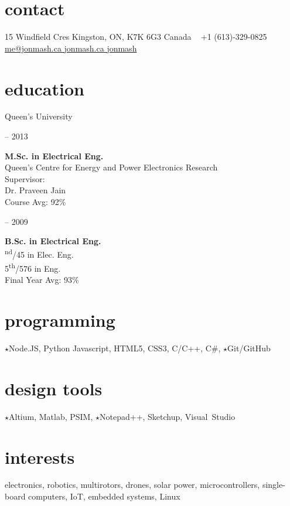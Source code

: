 
\begin{aside}
%
\section{contact}
15 Windfield Cres
Kingston, ON, K7K 6G3
Canada
~
+1 (613)-329-0825
~
\href{mailto:me@jonmash.ca}{me@jonmash.ca \faEnvelope}
\href{http://www.jonmash.ca}{jonmash.ca \faLink}
\href{https://github.com/jonmash}{jonmash \faGithub}
%
\section{education}
\restorecr
{\headingfont Queen's University}
\begin{center}
{ -- 2013} \\
\end{center}
\textbf{M.Sc. {\normalfont in Electrical Eng.}}\\
{\bodyfontit Queen’s Centre for Energy and Power Electronics Research}\\
Supervisor:\\ Dr. Praveen Jain\\
Course Avg: 92\%\\
\vspace{0.3cm}
\begin{center}
{ -- 2009} \\
\end{center}
\textbf{B.Sc. {\normalfont in Electrical Eng.}}\\
{\textsuperscript{nd}/45 in Elec. Eng. \\ 5\textsuperscript{th}/576 in Eng.}\\
Final Year Avg: 93\%\\
%
\section{programming}
{\color{orange} $\star$}Node.JS, Python
Javascript, HTML5, CSS3, C/C++, C\#,
{\color{orange} $\star$}Git/GitHub
%
\section{design tools}
{\color{orange} $\star$}Altium, Matlab, PSIM, {\color{orange} $\star$}Notepad++, Sketchup, Visual~Studio
%
\section{interests}
electronics, robotics, multirotors, drones, solar power, microcontrollers, single-board computers, IoT, embedded systems, Linux
\obeycr
\end{aside}